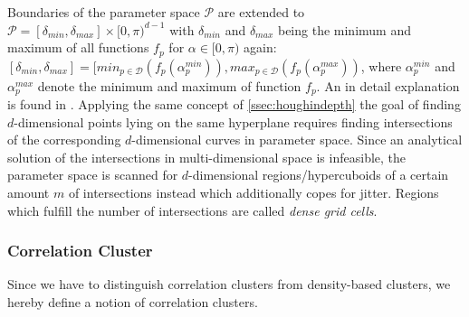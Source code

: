 
Boundaries of the parameter space $\mathcal{P}$ are extended to $\mathcal{P} = [\delta_{min}, \delta_{max}]\times [0,\pi)^{d-1}$ with $\delta_{min}$ and $\delta_{max}$ being the minimum and maximum of all functions $f_p$ for $\alpha \in [0,\pi)$ again: $[\delta_{min}, \delta_{max}] = [min_{p \in \mathcal{D}}(f_p(\alpha_p^{min})), max_{p \in \mathcal{D}}(f_p(\alpha_p^{max}))$, where $\alpha_p^{min}$ and $\alpha_p^{max}$ denote the minimum and maximum of function $f_p$. An in detail explanation is found in \textcite{CASHachtert2008robust}.
Applying the same concept of \autoref{ssec:houghindepth} the goal of finding $d$-dimensional points lying on the same hyperplane requires finding intersections of the corresponding $d$-dimensional curves in parameter space. Since an analytical solution of the intersections in multi-dimensional space is infeasible, the parameter space is scanned for $d$-dimensional regions/hypercuboids of a certain amount $m$ of intersections instead which additionally copes for jitter. Regions which fulfill the number of intersections are called \textit{dense grid cells}.

\subsubsection*{Correlation Cluster}
Since we have to distinguish correlation clusters from density-based clusters, we hereby define a notion of correlation clusters.

